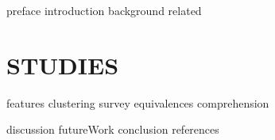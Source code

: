 \documentclass[11pt]{isuthesis}
\begin{document}


{preface}
\newpage
{}
{introduction}
{background}
{related}


\chapter{STUDIES}
\label{ch4}
{features}
{clustering}
{survey}
{equivalences}
{comprehension}

{discussion}
{futureWork}
{conclusion}
{references}
\end{document}
